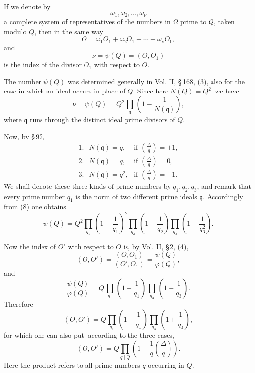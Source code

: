 \documentclass[11pt]{article}
\newcommand{\Jac}[2]{\left(\frac{#1}{#2}\right)}
\begin{document}
If we denote by
\[
 \omega_1,\omega_2,\ldots,\omega_\nu
\]
a complete system of representatives of the numbers in $\Omega$ prime to $Q$, taken modulo $Q$, then in the same way
\begin{equation}
 O=\omega_1O_1+\omega_2O_1+\cdots+\omega_\nu O_1,
\tag{6}
\end{equation}
and
\begin{equation}
 \nu=\psi(Q)=(O,O_1)
\tag{7}
\end{equation}
is the index of the divisor $O_1$ with respect to $O$.

The number $\psi(Q)$ was determined generally in Vol. II, \S\,168, (3), also for the case in which an ideal occurs in place of $Q$. Since here $N(Q)=Q^2$, we have
\begin{equation}
 \nu=\psi(Q)=Q^2\prod_{\mathfrak q}\left(1-\frac1{N(\mathfrak q)}\right),
\tag{8}
\end{equation}
where $\mathfrak q$ runs through the distinct ideal prime divisors of $Q$.

Now, by \S\,92,
\[
\begin{array}{lll}
1.& N(\mathfrak q)=q,   & \text{if } \Jac{\Delta}{q}=+1,\\
2.& N(\mathfrak q)=q,   & \text{if } \Jac{\Delta}{q}=0,\\
3.& N(\mathfrak q)=q^2, & \text{if } \Jac{\Delta}{q}=-1.
\end{array}
\]
We shall denote these three kinds of prime numbers by $q_1,q_2,q_3$, and remark that every prime number $q_1$ is the norm of two different prime ideals $\mathfrak q$. Accordingly from (8) one obtains
\begin{equation}
 \psi(Q)
 =Q^2
  \prod_{q_1}\left(1-\frac1{q_1}\right)^2
  \prod_{q_2}\left(1-\frac1{q_2}\right)
  \prod_{q_3}\left(1-\frac1{q_3^2}\right).
\tag{9}
\end{equation}

Now the index of $O'$ with respect to $O$ is, by Vol. II, \S\,2, (4),
\[
 (O,O')=\frac{(O,O_1)}{(O',O_1)}=\frac{\psi(Q)}{\varphi(Q)},
\]
and
\[
 \frac{\psi(Q)}{\varphi(Q)}
 =Q\prod_{q_1}\left(1-\frac1{q_1}\right)
    \prod_{q_3}\left(1+\frac1{q_3}\right).
\]
Therefore
\[
 (O,O')
 =Q\prod_{q_1}\left(1-\frac1{q_1}\right)
    \prod_{q_3}\left(1+\frac1{q_3}\right),
\]
for which one can also put, according to the three cases,
\begin{equation}
 (O,O')=
 Q\prod_{q\mid Q}\left(1-\frac1q\Jac{\Delta}{q}\right).
\tag{10}
\end{equation}
Here the product refers to all prime numbers $q$ occurring in $Q$.
\end{document}
